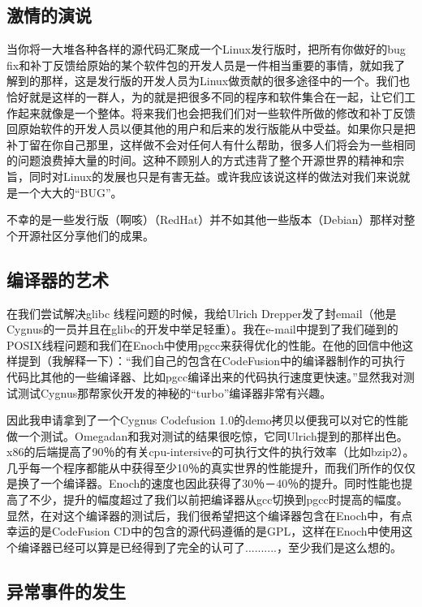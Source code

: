 \subsection{激情的演说}

当你将一大堆各种各样的源代码汇聚成一个Linux发行版时，把所有你做好的bug fix和补丁反馈给原始的某个软件包的开发人员是一件相当重要的事情，就如我了解到的那样，这是发行版的开发人员为Linux做贡献的很多途径中的一个。我们也恰好就是这样的一群人，为的就是把很多不同的程序和软件集合在一起，让它们工作起来就像是一个整体。将来我们也会把我们们对一些软件所做的修改和补丁反馈回原始软件的开发人员以便其他的用户和后来的发行版能从中受益。如果你只是把补丁留在你自己那里，这样做不会对任何人有什么帮助，很多人们将会为一些相同的问题浪费掉大量的时间。这种不顾别人的方式违背了整个开源世界的精神和宗旨，同时对Linux的发展也只是有害无益。或许我应该说这样的做法对我们来说就是一个大大的“BUG”。

不幸的是一些发行版（啊咳）（RedHat）并不如其他一些版本（Debian）那样对整个开源社区分享他们的成果。

\subsection{编译器的艺术}

在我们尝试解决glibc 线程问题的时候，我给Ulrich Drepper发了封email（他是Cygnus的一员并且在glibc的开发中举足轻重）。我在e-mail中提到了我们碰到的POSIX线程问题和我们在Enoch中使用pgcc来获得优化的性能。在他的回信中他这样提到（我解释一下）：“我们自己的包含在CodeFusion中的编译器制作的可执行代码比其他的一些编译器、比如pgcc编译出来的代码执行速度更快速。”显然我对测试测试Cygnus那帮家伙开发的神秘的“turbo”编译器非常有兴趣。

因此我申请拿到了一个Cygnus Codefusion 1.0的demo拷贝以便我可以对它的性能做一个测试。Omegadan和我对测试的结果很吃惊，它同Ulrich提到的那样出色。x86的后端提高了90％的有关cpu-intersive的可执行文件的执行效率（比如bzip2）。几乎每一个程序都能从中获得至少10％的真实世界的性能提升，而我们所作的仅仅是换了一个编译器。Enoch的速度也因此获得了30％－40％的提升。同时性能也提高了不少，提升的幅度超过了我们以前把编译器从gcc切换到pgcc时提高的幅度。显然，在对这个编译器的测试后，我们很希望把这个编译器包含在Enoch中，有点幸运的是CodeFusion CD中的包含的源代码遵循的是GPL，这样在Enoch中使用这个编译器已经可以算是已经得到了完全的认可了..........，至少我们是这么想的。

\subsection{异常事件的发生}

